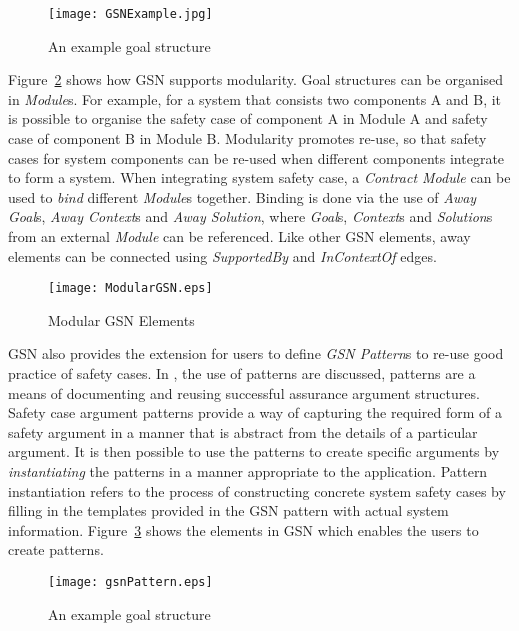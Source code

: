 \begin{figure}
	\centering
	\texttt{[image: GSNExample.jpg]}
	\caption{An example goal structure}
	\label{fig:goalStructure}
\end{figure}
Figure~\ref{fig:modularGSN} shows how GSN supports modularity. Goal structures can be organised in \textit{Module}s. For example, for a system that consists two components A and B, it is possible to organise the safety case of component A in Module A and safety case of component B in Module B. Modularity promotes re-use, so that safety cases for system components can be re-used when different components integrate to form a system. When integrating system safety case, a \textit{Contract Module} can be used to \textit{bind} different \textit{Module}s together. Binding is done via the use of \textit{Away Goal}s, \textit{Away Context}s and \textit{Away Solution}, where \textit{Goal}s, \textit{Context}s and \textit{Solution}s from an external \textit{Module} can be referenced. Like other GSN elements, away elements can be connected using \textit{SupportedBy} and \textit{InContextOf} edges.

\begin{figure}
	\centering
	\texttt{[image: ModularGSN.eps]}
	\caption{Modular GSN Elements}
	\label{fig:modularGSN}
\end{figure}

GSN also provides the extension for users to define \textit{GSN Pattern}s to re-use good practice of safety cases. In \cite{}, the use of patterns are discussed, patterns are a means of documenting and reusing successful assurance argument structures. Safety case argument patterns provide a way of capturing the required form of a safety argument in a manner that is abstract from the details of a particular argument. It is then possible to use the patterns to create specific arguments by \textit{instantiating} the patterns in a manner appropriate to the application. Pattern instantiation refers to the process of constructing concrete system safety cases by filling in the templates provided in the GSN pattern with actual system information. Figure~\ref{fig:gsnPatterns} shows the elements in GSN which enables the users to create patterns.

\begin{figure}
	\centering
	\texttt{[image: gsnPattern.eps]}
	\caption{An example goal structure}
	\label{fig:gsnPatterns}
\end{figure}

